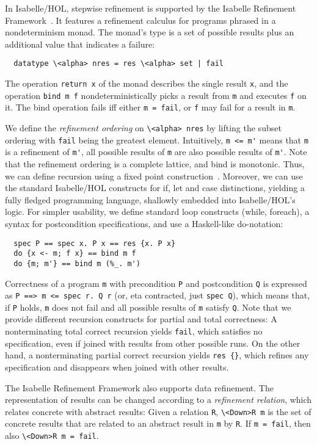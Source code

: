 \documentclass[smallcondensed]{svjour3}     %
\newcommand{\isai}{\lstinline[language=isabelle,basicstyle=\normalsize\ttfamily\slshape]}
\begin{document}
In Isabelle/HOL, stepwise refinement is supported by the Isabelle Refinement Framework~\cite{LaTu12,La12}. 
It features a refinement calculus for programs phrased in a nondeterminism monad. 
The monad's type is a set of possible results plus an additional value that indicates a failure:
\begin{lstlisting}
  datatype \<alpha> nres = res \<alpha> set | fail
\end{lstlisting}
The operation \isai{return x} of the monad describes the single result \isai{x}, and the 
operation \isai{bind m f} nondeterministically picks a result from \isai{m} and executes \isai{f} on it. 
The bind operation fails iff either \isai{m = fail}, or \isai{f} may fail for a result in \isai{m}.

We define the \emph{refinement ordering} on \isai{\<alpha> nres} by lifting the subset ordering with \isai{fail} being the greatest element.
Intuitively, \isai{m <= m'} means that \isai{m} is a refinement of \isai{m'}, \ie all possible results of \isai{m} are 
also possible results of \isai{m'}. 
Note that the refinement ordering is a complete lattice, and bind is monotonic. Thus, we can define recursion using a fixed point construction~\cite{Kr10}.
Moreover, we can use the standard Isabelle/HOL constructs for if, let and case distinctions, yielding a fully fledged programming 
language, shallowly embedded into Isabelle/HOL's logic. For simpler usability, we define standard loop constructs (while, foreach), 
a syntax for postcondition specifications, and use a Haskell-like do-notation:
\begin{lstlisting}
  spec P == spec x. P x == res {x. P x}
  do {x <- m; f x} == bind m f
  do {m; m'} == bind m (%_. m')
\end{lstlisting}

Correctness of a program \isai{m} with precondition \isai{P} and postcondition \isai{Q} is expressed as \isai{P ==> m <= spec r. Q r} (or, eta contracted, just \isai{spec Q}), which
means that, if \isai{P} holds, \isai{m} does not fail and all possible results of \isai{m} satisfy \isai{Q}. Note that we provide different recursion constructs
for partial and total correctness: A nonterminating total correct recursion yields \isai{fail}, which satisfies no specification, even if joined 
with results from other possible runs. On the other hand, a nonterminating partial correct recursion yields \isai|res {}|, which refines any specification 
and disappears when joined with other results.

The Isabelle Refinement Framework also supports data refinement. The representation of results can be changed according to a \emph{refinement relation}, 
which relates concrete with abstract results: Given a relation \isai{R}, \isai{\<Down>R m} is the set of concrete results that are related to an 
abstract result in \isai{m} by \isai{R}. If \isai{m = fail}, then also \isai{\<Down>R m = fail}.
\end{document}
